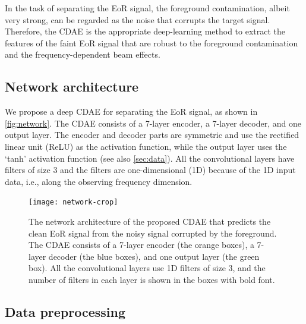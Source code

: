 \documentclass[letters,a4paper,fleqn,usenatbib]{mnras}
\begin{document}
In the task of separating the EoR signal, the foreground contamination,
albeit very strong, can be regarded as the noise that corrupts the
target signal.
Therefore, the CDAE is the appropriate deep-learning method to extract
the features of the faint EoR signal that are robust to the foreground
contamination and the frequency-dependent beam effects.


\subsection{Network architecture}
\label{sec:architecture}

We propose a deep CDAE for separating the EoR signal, as shown
in \autoref{fig:network}.
The CDAE consists of a 7-layer encoder, a 7-layer decoder,
and one output layer.
The encoder and decoder parts are symmetric and use the rectified
linear unit (ReLU) as the activation function, while the output layer
uses the `tanh' activation function (see also \autoref{sec:data}).
All the convolutional layers have filters of size 3 and the filters
are one-dimensional (1D) because of the 1D input data, i.e., along the
observing frequency dimension.

\begin{figure}
  \centering
  \texttt{[image: network-crop]}
  \caption{\label{fig:network}%
    The network architecture of the proposed CDAE that
    predicts the clean EoR signal from the noisy signal corrupted by
    the foreground.
    The CDAE consists of a 7-layer encoder (the orange boxes),
    a 7-layer decoder (the blue boxes), and one output layer
    (the green box).
    All the convolutional layers use 1D filters of size 3, and
    the number of filters in each layer is shown in the boxes
    with bold font.}
\end{figure}


\subsection{Data preprocessing}
\label{sec:data}
\end{document}
